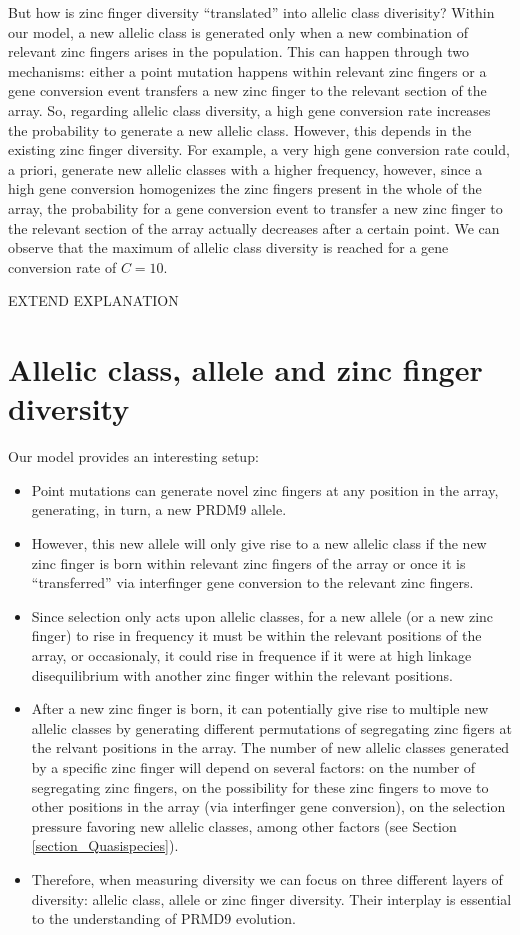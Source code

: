 \documentclass[a4paper,10pt]{article}
\begin{document}
But how is zinc finger diversity ``translated'' into allelic class diverisity? Within our model, a new allelic class is generated only when a new combination of relevant zinc fingers arises in the population. This can happen through two mechanisms: either a point mutation happens within relevant zinc fingers or a gene conversion event transfers a new zinc finger to the relevant section of the array. So, regarding allelic class diversity, a high gene conversion rate increases the probability to generate a new allelic class. However, this depends in the existing zinc finger diversity. For example, a very high gene conversion rate could, a priori, generate new allelic classes with a higher frequency, however, since a high gene conversion homogenizes the zinc fingers present in the whole of the array, the probability for a gene conversion event to transfer a new zinc finger to the relevant section of the array actually decreases after a certain point. We can observe that the maximum of allelic class diversity is reached for a gene conversion rate of $C=10$. 

EXTEND EXPLANATION


\section{Allelic class, allele and zinc finger diversity}
\label{section_AC_allele_znf_div}
Our model provides an interesting setup:
\begin{itemize}
 \item Point mutations can generate novel zinc fingers at any position in the array, generating, in turn, a new PRDM9 allele. 
 \item However, this new allele will only give rise to a new allelic class if the new zinc finger is born within relevant zinc fingers of the array or once it is ``transferred'' via interfinger gene conversion to the relevant zinc fingers.
 \item Since selection only acts upon allelic classes, for a new allele (or a new zinc finger) to rise in frequency it must be within the relevant positions of the array, or occasionaly, it could rise in frequence if it were at high linkage disequilibrium with another zinc finger within the relevant positions.
 \item After a new zinc finger is born, it can potentially give rise to multiple new allelic classes by generating different permutations of segregating zinc figers at the relvant positions in the array. The number of new allelic classes generated by a specific zinc finger will depend on several factors: on the number of segregating zinc fingers, on the possibility for these zinc fingers to move to other positions in the array (via interfinger gene conversion), on the selection pressure favoring new allelic classes, among other factors (see Section \ref{section_Quasispecies}).
 \item Therefore, when measuring diversity we can focus on three different layers of diversity: allelic class, allele or zinc finger diversity. Their interplay is essential to the understanding of PRMD9 evolution.  
 \end{itemize}
\end{document}
